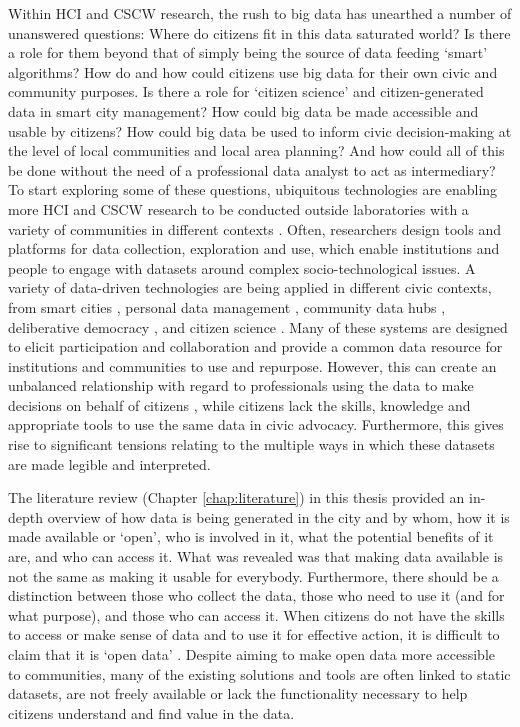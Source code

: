 Within HCI and CSCW research, the rush to big data has unearthed a number of unanswered questions: Where do citizens fit in this data saturated world? Is there a role for them beyond that of simply being the source of data feeding `smart' algorithms? How do and how could citizens use big data for their own civic and community purposes. Is there a role for `citizen science' and citizen-generated data in smart city management? How could big data be made accessible and usable by citizens? How could big data be used to inform civic decision-making at the level of local communities and local area planning? And how could all of this be done without the need of a professional data analyst to act as intermediary? To start exploring some of these questions, ubiquitous technologies are enabling more HCI and CSCW research to be conducted outside laboratories with a variety of communities in different contexts \citep{carroll_trajectory_2003,rogers_interaction_2011,vlachokyriakos_postervote:_2014,golsteijn_sens-us:_2016,lindley_surfacing_2017}. Often, researchers design tools and platforms for data collection, exploration and use, which enable institutions and people to engage with datasets around complex socio-technological issues. A variety of data-driven technologies are being applied in different civic contexts, from smart cities \citep{kitchin_knowing_2015}, personal data management \citep{puussaar_enhancing_2017}, community data hubs \citep{crabtree_accountable_2017}, deliberative democracy \citep{johnson_community_2017}, and citizen science \citep{gallacher_investigating_2014,balestrini_iot_2015}. Many of these systems are designed to elicit participation and collaboration and provide a common data resource \citep{asad_creating_2017,balestrini_city_2017} for institutions and communities to use and repurpose. However, this can create an unbalanced relationship with regard to professionals using the data to make decisions on behalf of citizens \citep{van_dijck_datafication_2014}, while citizens lack the skills, knowledge and appropriate tools to use the same data in civic advocacy. Furthermore, this gives rise to significant tensions relating to the multiple ways in which these datasets are made legible and interpreted.

The literature review (Chapter \ref{chap:literature}) in this thesis provided an in-depth overview of how data is being generated in the city and by whom, how it is made available or `open', who is involved in it, what the potential benefits of it are, and who can access it. What was revealed was that making data available is not the same as making it usable for everybody. Furthermore, there should be a distinction between those who collect the data, those who need to use it (and for what purpose), and those who can access it. When citizens do not have the skills to access or make sense of data and to use it for effective action, it is difficult to claim that it is `open data' \citep{gurstein_open_2011}. Despite aiming to make open data more accessible to communities, many of the existing solutions and tools are often linked to static datasets, are not freely available or lack the functionality necessary to help citizens understand and find value in the data.

